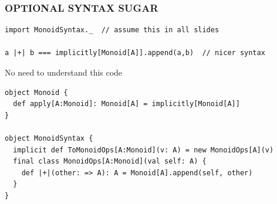 \documentclass{beamer}
\begin{document}
\begin{frame}[fragile]\frametitle{OPTIONAL SYNTAX SUGAR}
  \begin{block}{}
  \begin{lstlisting}
import MonoidSyntax._  // assume this in all slides

a |+| b === implicitly[Monoid[A]].append(a,b)  // nicer syntax
  \end{lstlisting}
  \end{block}

  \begin{block}{No need to understand this code}
  \begin{lstlisting}
object Monoid {
  def apply[A:Monoid]: Monoid[A] = implicitly[Monoid[A]]
}

object MonoidSyntax {
  implicit def ToMonoidOps[A:Monoid](v: A) = new MonoidOps[A](v)
  final class MonoidOps[A:Monoid](val self: A) {
    def |+|(other: => A): A = Monoid[A].append(self, other)
  }
}
  \end{lstlisting}
  \end{block}
\end{frame}
\end{document}
